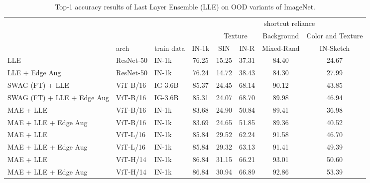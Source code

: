 \documentclass[10pt,twocolumn,letterpaper]{article}
\begin{document}
\begin{table}[h]
\centering
\begin{tabular}{@{}lllccccc@{}}
\toprule
                           &           &            & \multicolumn{1}{c|}{}      & \multicolumn{4}{c}{shortcut reliance}                                                   \\ \cmidrule(l){5-8}
                           &           &            & \multicolumn{1}{c|}{}      & \multicolumn{2}{c|}{Texture}      & \multicolumn{1}{c|}{Background} & Color and Texture \\
                           & arch      & train data & \multicolumn{1}{c|}{IN-1k} & SIN   & \multicolumn{1}{c|}{IN-R} & \multicolumn{1}{c|}{Mixed-Rand} & IN-Sketch         \\ \midrule
LLE                        & ResNet-50 & IN-1k      & 76.25                      & 15.25 & 37.31                     & 84.40                           & 24.67             \\
LLE + Edge Aug             & ResNet-50 & IN-1k      & 76.24                      & 14.72 & 38.43                     & 84.30                           & 27.99             \\ \midrule
SWAG (FT) + LLE            & ViT-B/16  & IG-3.6B    & 85.37                      & 24.45 & 68.14                     & 90.12                           & 43.85             \\
SWAG (FT) + LLE + Edge Aug & ViT-B/16  & IG-3.6B    & 85.31                      & 24.07 & 68.70                     & 89.98                           & 46.94             \\ \midrule
MAE + LLE                  & ViT-B/16  & IN-1k      & 83.68                      & 24.90 & 50.84                     & 89.41                           & 36.98             \\
MAE + LLE + Edge Aug       & ViT-B/16  & IN-1k      & 83.69                      & 24.65 & 51.85                     & 89.36                           & 40.52             \\ \midrule
MAE + LLE                  & ViT-L/16  & IN-1k      & 85.84                      & 29.52 & 62.24                     & 91.58                           & 46.70             \\
MAE + LLE + Edge Aug       & ViT-L/16  & IN-1k      & 85.84                      & 29.32 & 63.13                     & 91.41                           & 49.39             \\ \midrule
MAE + LLE                  & ViT-H/14  & IN-1k      & 86.84                      & 31.15 & 66.21                     & 93.01                           & 50.60             \\
MAE + LLE + Edge Aug                 & ViT-H/14  & IN-1k      & 86.84                      & 30.94 & 66.89                     & 92.86                           & 53.39             \\\bottomrule
\end{tabular}
\caption{Top-1 accuracy results of Last Layer Ensemble (LLE) on OOD variants of ImageNet.}
\label{appx:tab:top_1_acc_ood_in}
\end{table}
\end{document}
